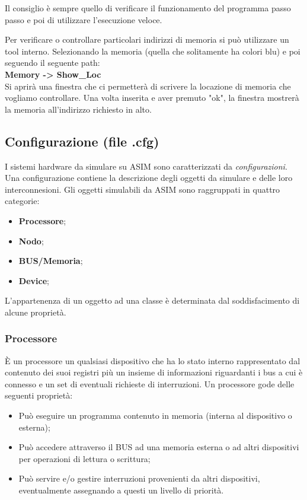 Il consiglio è sempre quello di verificare il funzionamento del programma passo passo e poi di utilizzare l'esecuzione veloce.

Per verificare o controllare particolari indirizzi di memoria si può utilizzare un tool interno.
Selezionando la memoria (quella che solitamente ha colori blu) e poi seguendo il seguente path:
\\
\textbf{Memory -> Show\_Loc}
\\
Si aprirà una finestra che ci permetterà di scrivere la locazione di memoria che vogliamo controllare. Una volta inserita e aver premuto "ok", la finestra mostrerà la memoria all'indirizzo richiesto in alto.

\subsection{Configurazione (file .cfg)} \label{par:cfg}

I sistemi hardware da simulare su ASIM sono caratterizzati da \textit{configurazioni}. Una configurazione contiene la descrizione degli oggetti da simulare e delle loro interconnesioni.
Gli oggetti simulabili da ASIM sono raggruppati in quattro categorie:

\begin{itemize}
    \item \textbf{Processore};
    \item \textbf{Nodo};
    \item \textbf{BUS/Memoria};
    \item \textbf{Device};
\end{itemize}

L'appartenenza di un oggetto ad una classe è determinata dal soddisfacimento di alcune proprietà.

\subsubsection{Processore}
\uppercase{è} un processore un qualsiasi dispositivo che ha lo stato interno rappresentato dal contenuto dei suoi registri più un insieme di informazioni riguardanti i bus a cui è connesso e un set di eventuali richieste di interruzioni.
Un processore gode delle seguenti proprietà:

\begin{itemize}
    \item Può eseguire un programma contenuto in memoria (interna al dispositivo o esterna);
    \item Può accedere attraverso il BUS ad una memoria esterna o ad altri dispositivi per operazioni di lettura o scrittura;
    \item Può servire e/o gestire interruzioni provenienti da altri dispositivi, eventualmente assegnando a questi un livello di priorità.
\end{itemize}

